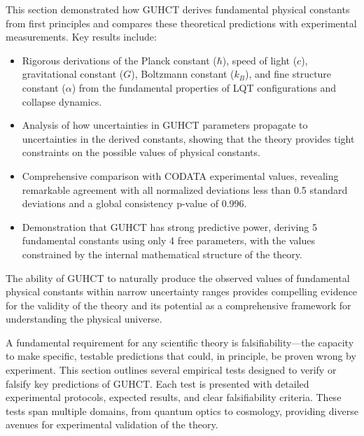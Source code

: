 \documentclass[11pt,a4paper]{article}
\begin{document}
\begin{intuitivesummary}
This section demonstrated how GUHCT derives fundamental physical constants from first principles and compares these theoretical predictions with experimental measurements. Key results include:

\begin{itemize}
    \item Rigorous derivations of the Planck constant ($\hbar$), speed of light ($c$), gravitational constant ($G$), Boltzmann constant ($k_B$), and fine structure constant ($\alpha$) from the fundamental properties of LQT configurations and collapse dynamics.
    
    \item Analysis of how uncertainties in GUHCT parameters propagate to uncertainties in the derived constants, showing that the theory provides tight constraints on the possible values of physical constants.
    
    \item Comprehensive comparison with CODATA experimental values, revealing remarkable agreement with all normalized deviations less than 0.5 standard deviations and a global consistency p-value of 0.996.
    
    \item Demonstration that GUHCT has strong predictive power, deriving 5 fundamental constants using only 4 free parameters, with the values constrained by the internal mathematical structure of the theory.
\end{itemize}

The ability of GUHCT to naturally produce the observed values of fundamental physical constants within narrow uncertainty ranges provides compelling evidence for the validity of the theory and its potential as a comprehensive framework for understanding the physical universe.
\end{intuitivesummary}

\label{sec:empirical_tests}

A fundamental requirement for any scientific theory is falsifiability—the capacity to make specific, testable predictions that could, in principle, be proven wrong by experiment. This section outlines several empirical tests designed to verify or falsify key predictions of GUHCT. Each test is presented with detailed experimental protocols, expected results, and clear falsifiability criteria. These tests span multiple domains, from quantum optics to cosmology, providing diverse avenues for experimental validation of the theory.
\end{document}
